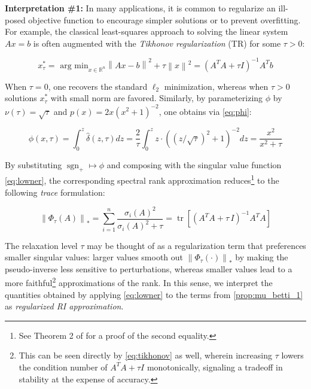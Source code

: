 \documentclass[pdflatex,sn-mathphys-num]{sn-jnl}
\begin{document}
\textbf{Interpretation \#1:} In many applications, it is common to regularize an ill-posed objective function to encourage simpler solutions or to prevent overfitting. For example, the classical least-squares approach to solving the linear system \(Ax = b\) is often augmented with the \emph{Tikhonov regularization} (TR) for some \(\tau > 0\):

\[x_{\tau}^{\ast} = \text{ arg min}_{x \in \mathbb{R}^{n}}\left\| {Ax - b} \right\|^{2} + \tau\left\| x \right\|^{2} =  \left( A^{T}A + \tau I \right) ^{- 1}A^{T}b\] \protect{}\label{eq:tikhonov}{}

When \(\tau = 0\), one recovers the standard \(\ell_{2}\) minimization, whereas when \(\tau > 0\) solutions \(x_{\tau}^{\ast}\) with small norm are favored. Similarly, by parameterizing \(\phi\) by \(\nu(\tau) = \sqrt{\tau}\) and \(p(x) = 2x \left( x^{2} + 1 \right) ^{- 2}\), one obtains via \ref{eq:phi}:

\[\phi(x,\tau) = \int_{0}^{z}\hat{\delta}(z,\tau)dz = \frac{2}{\tau}\int_{0}^{z}z \cdot \left( \left( z/\sqrt{\tau} \right)^{2} + 1 \right)^{- 2}dz = \frac{x^{2}}{x^{2} + \tau}\] \protect{}\label{eq:tikhonov_sf}{}

By substituting \(\operatorname{sgn}_{+} \mapsto \phi\) and composing with the singular value function \ref{eq:lowner}, the corresponding spectral rank approximation reduces\footnote{See Theorem 2 of \cite{zhao2012approximation} for a proof of the second equality.} to the following \emph{trace} formulation:

\[\left\| {\Phi_{\tau}(A)} \right\|_{\ast} = \sum_{i = 1}^{n}\frac{\sigma_{i}(A)^{2}}{\sigma_{i}(A)^{2} + \tau} = \operatorname{tr} \left[  \left( A^{T}A + \tau\, I \right) ^{- 1}A^{T}A \right] \] \protect{}\label{eq:tikhonov_1}{}

The relaxation level \(\tau\) may be thought of as a regularization term that preferences smaller singular values: larger values smooth out \(\left\| {\Phi_{\tau} ( \cdot ) } \right\|_{\ast}\) by making the pseudo-inverse less sensitive to perturbations, whereas smaller values lead to a more faithful\footnote{This can be seen directly by \ref{eq:tikhonov} as well, wherein increasing \(\tau\) lowers the condition number of \(A^{T}A + \tau I\) monotonically, signaling a tradeoff in stability at the expense of accuracy.} approximations of the rank. In this sense, we interpret the quantities obtained by applying \ref{eq:lowner} to the terms from \ref{prop:mu_betti_1} as \emph{regularized RI approximation}.
\end{document}
